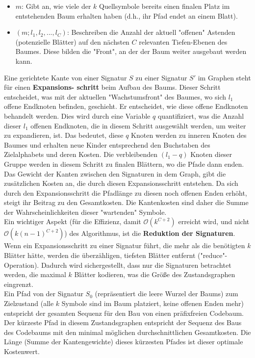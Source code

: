 \documentclass[a4paper,10pt,ngerman]{scrartcl}
\begin{document}
\begin{itemize}
  \item $m$: Gibt an, wie viele der $k$ Quellsymbole bereits einen finalen Platz im entstehenden Baum erhalten haben (d.h., ihr Pfad endet an einem Blatt). 
  \item $(m; l_1, l_2, ..., l_C)$:     Beschreiben die Anzahl der aktuell "offenen" Astenden (potenzielle Blätter) auf den nächsten $C$ relevanten Tiefen-Ebenen des Baumes. Diese bilden die "Front", an der der Baum weiter ausgebaut werden kann. 
\end{itemize}

Eine gerichtete Kante von einer Signatur $S$ zu einer Signatur $S'$ im Graphen steht für einen \textbf{Expansions- schritt} beim Aufbau des Baums. Dieser Schritt entscheidet, was mit der aktuellen "Wachstumsfront" des Baumes, wo sich $l_1$ offene Endknoten befinden, geschieht. Er entscheidet, wie diese offene Endknoten behandelt werden. Dies wird durch eine Variable $q$ quantifiziert, was die Anzahl dieser $l_1$ offenen Endknoten, die in diesem Schritt ausgewählt werden, um weiter zu expandieren, ist. Das bedeutet, diese $q$ Knoten werden zu inneren Knoten des Baumes und erhalten neue Kinder entsprechend den Buchstaben des Zielalphabets und deren Kosten. Die verbleibenden $(l_1 - q)$ Knoten dieser Gruppe werden in diesem Schritt zu finalen Blättern, wo die Pfade dann enden.  
\\
Das Gewicht der Kanten zwischen den Signaturen in dem Graph, gibt die zusätzlichen Kosten an, die durch diesen Expansionsschritt entstehen. Da sich durch den Expansionsschritt die Pfadlänge zu diesen noch offenen Enden erhöht, steigt ihr Beitrag zu den Gesamtkosten. Die Kantenkosten sind daher die Summe der Wahrscheinlichkeiten dieser "wartenden" Symbole.
\\
Ein wichtiger Aspekt (für die Effizienz, damit $\mathcal{O}(k^{C+2})$ erreicht wird, und nicht $\mathcal{O}(k(n-1)^{C+2})$) des Algorithmus, ist die \textbf{Reduktion der Signaturen}. Wenn ein Expansionsschritt zu einer Signatur führt, die mehr als die benötigten $k$ Blätter hätte, werden die überzähligen, tiefsten Blätter entfernt ("reduce"-Operation). Dadurch wird sichergestellt, dass nur die Signaturen betrachtet werden, die maximal $k$ Blätter kodieren, was die Größe des Zustandsgraphen eingrenzt. 
\\
Ein Pfad von der Signatur $S_0$ (repräsentiert die leere Wurzel der Baums) zum Zielzustand (alle $k$ Symbole sind im Baum platziert, keine offenen Enden mehr) entspricht der gesamten Sequenz für den Bau von einen präfixfreien Codebaum. Der kürzeste Pfad in diesem Zustandsgraphen entspricht der Sequenz des Baus des Codebaums mit den minimal möglichen durchschnittlichen Gesamtkosten. Die Länge (Summe der Kantengewichte) dieses kürzesten Pfades ist dieser optimale Kostenwert. 
\end{document}
